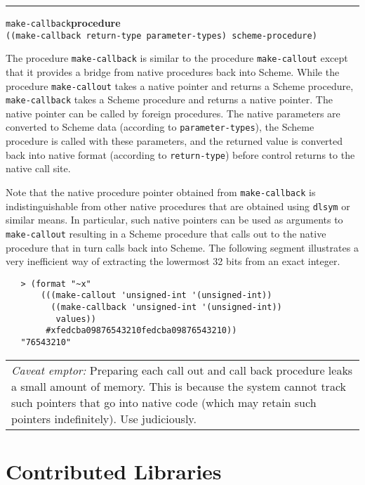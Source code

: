 \documentclass[onecolumn, 12pt, twoside, openright, dvipdfm]{book}
\makeatletter
\newcommand{\BoxedText}[2]{
  \vspace{.05in}
  \begin{center}
    \begin{tabular}{|p{4.6in}|} {\large \emph{#1}} #2 \end{tabular}
  \end{center}
  \vspace{.05in}
}
\newcommand{\idxlabeldefun}[5]{
\vspace{1ex}
\rule{\textwidth}{2pt}
{\phantomsection\index{#1@\texttt{#2}}\label{#3}{\Large\texttt{#4}}\hfill\textbf{#5}}\\}
\newcommand{\idxdefun}[3]{\idxlabeldefun{#1}{#2}{#1}{#2}{#3}}
\newcommand{\defun}[2]{\idxdefun{#1}{#1}{#2}}
\makeatother
\begin{document}
\defun{make-callback}{procedure}
\texttt{((make-callback return-type parameter-types) scheme-procedure)}

The procedure \texttt{make-callback} is similar to the procedure
\texttt{make-callout} except that it provides a bridge from native
procedures back into Scheme.  While the procedure
\texttt{make-callout} takes a native pointer and returns a Scheme
procedure, \texttt{make-callback} takes a Scheme procedure and
returns a native pointer.  The native pointer can be called by
foreign procedures.  The native parameters are converted to Scheme
data (according to \texttt{parameter-types}), the Scheme procedure
is called with these parameters, and the returned value is converted
back into native format (according to \texttt{return-type}) before
control returns to the native call site.


Note that the native procedure pointer obtained from
\texttt{make-callback} is indistinguishable from other native
procedures that are obtained using \texttt{dlsym} or similar means.
In particular, such native pointers can be used as arguments to
\texttt{make-callout} resulting in a Scheme procedure that calls out
to the native procedure that in turn calls back into Scheme.  The
following segment illustrates a very inefficient way of extracting
the lowermost 32 bits from an exact integer.

\begin{verbatim}
   > (format "~x"
       (((make-callout 'unsigned-int '(unsigned-int))
         ((make-callback 'unsigned-int '(unsigned-int)) 
          values))
        #xfedcba09876543210fedcba09876543210))
   "76543210"
\end{verbatim}

\BoxedText{Caveat emptor:}{Preparing each call out and call back
procedure leaks a small amount of memory.  This is because the
system cannot track such pointers that go into native code
(which may retain such pointers indefinitely).  Use judiciously.}


\chapter{\label{chapter:contributed}Contributed Libraries}
\end{document}
